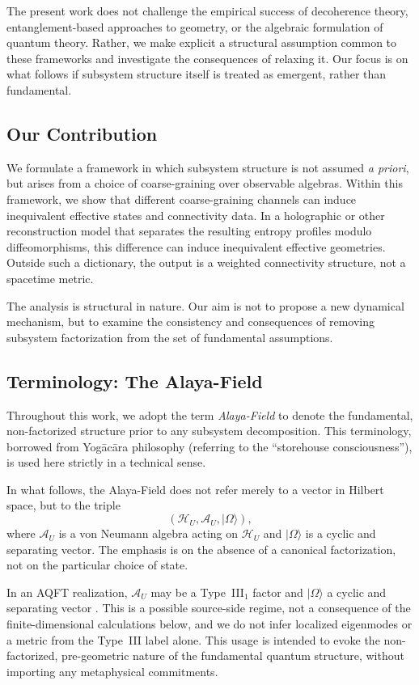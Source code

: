 \documentclass[12pt,a4paper]{article}
\begin{document}
The present work does not challenge the empirical success of decoherence theory, entanglement-based approaches to geometry, or the algebraic formulation of quantum theory.
Rather, we make explicit a structural assumption common to these frameworks and investigate the consequences of relaxing it.
Our focus is on what follows if subsystem structure itself is treated as emergent, rather than fundamental.

\subsection{Our Contribution}

We formulate a framework in which subsystem structure is not assumed \emph{a priori}, but arises from a choice of coarse-graining over observable algebras.
Within this framework, we show that different coarse-graining channels can induce inequivalent effective states and connectivity data.  In a holographic or other reconstruction model that separates the resulting entropy profiles modulo diffeomorphisms, this difference can induce inequivalent effective geometries.  Outside such a dictionary, the output is a weighted connectivity structure, not a spacetime metric.

The analysis is structural in nature.
Our aim is not to propose a new dynamical mechanism, but to examine the consistency and consequences of removing subsystem factorization from the set of fundamental assumptions.

\subsection{Terminology: The Alaya-Field}

Throughout this work, we adopt the term \emph{Alaya-Field} to denote the fundamental, non-factorized structure prior to any subsystem decomposition.
This terminology, borrowed from Yogācāra philosophy (referring to the ``storehouse consciousness''), is used here strictly in a technical sense.

In what follows, the Alaya-Field does not refer merely to a vector in Hilbert space, but to the triple
\[
(\mathcal{H}_U, \mathcal{A}_U, |\Omega\rangle),
\]
where $\mathcal{A}_U$ is a von Neumann algebra acting on $\mathcal{H}_U$ and $|\Omega\rangle$ is a cyclic and separating vector.
The emphasis is on the absence of a canonical factorization, not on the particular choice of state.

In an AQFT realization, $\mathcal A_U$ may be a Type~III$_1$ factor and $|\Omega\rangle$ a cyclic and separating vector \cite{Haag1996}.  This is a possible source-side regime, not a consequence of the finite-dimensional calculations below, and we do not infer localized eigenmodes or a metric from the Type~III label alone.
This usage is intended to evoke the non-factorized, pre-geometric nature of the fundamental quantum structure, without importing any metaphysical commitments.
\end{document}
